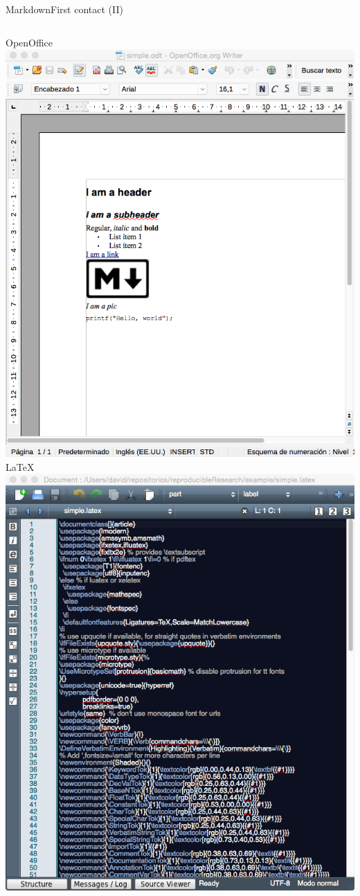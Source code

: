 \documentclass{beamer}
\begin{document}
\begin{frame}[plain]{Markdown}{First contact (II)}
 \begin{columns}
     \column{0.3\dimexpr\paperwidth-10pt}
	 	\centering OpenOffice \\
		\includegraphics[height=\linewidth]{figs/odt.png} 
     \column{0.3\dimexpr\paperwidth-10pt}
	 	\centering \LaTeX \\
		\includegraphics[height=\linewidth]{figs/latex.png} 

\end{columns}
\end{frame}
\end{document}
